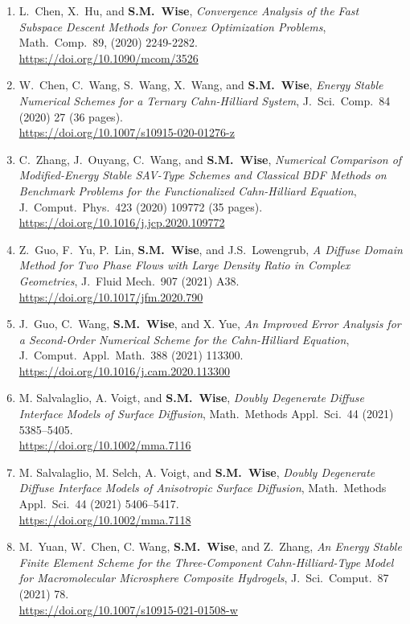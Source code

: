 \documentclass[10pt,letterpaper]{article}
\begin{document}
\begin{enumerate}
	\item
L.~Chen, X.~Hu, and \textbf{S.M.~Wise}, {\sl Convergence Analysis of the Fast Subspace Descent Methods for Convex Optimization Problems}, Math.~Comp.~89, (2020) 2249-2282.
	\\ 
\url{https://doi.org/10.1090/mcom/3526}

	\item
W.~Chen, C.~Wang, S.~Wang, X.~Wang, and \textbf{S.M.~Wise}, {\sl Energy Stable Numerical Schemes for a Ternary Cahn-Hilliard System}, J.~Sci.~Comp.~84 (2020) 27 (36 pages).
	\\ 
\url{https://doi.org/10.1007/s10915-020-01276-z}

	\item
C.~Zhang, J.~Ouyang, C.~Wang, and \textbf{S.M.~Wise}, {\sl Numerical Comparison of Modified-Energy Stable SAV-Type Schemes and Classical BDF Methods on Benchmark Problems for the Functionalized Cahn-Hilliard Equation}, J.~Comput.~Phys.~423 (2020) 109772 (35 pages).
	\\ 
\url{https://doi.org/10.1016/j.jcp.2020.109772}

	\item
Z.~Guo, F.~Yu, P.~Lin, \textbf{S.M.~Wise}, and J.S.~Lowengrub, {\sl A Diffuse Domain Method for Two Phase Flows with Large Density Ratio in Complex Geometries}, J.~Fluid Mech.~907 (2021) A38.
	\\
\url{https://doi.org/10.1017/jfm.2020.790}

	\item
J.~Guo, C.~Wang, \textbf{S.M.~Wise}, and X. Yue, {\sl An Improved Error Analysis for a Second-Order Numerical Scheme for the Cahn-Hilliard Equation}, J.~Comput.~Appl.~Math.~388 (2021) 113300.
	\\
\url{https://doi.org/10.1016/j.cam.2020.113300}

	\item
M. Salvalaglio, A. Voigt, and \textbf{S.M.~Wise}, {\sl Doubly Degenerate Diffuse Interface Models of Surface Diffusion}, Math.~Methods Appl.~Sci.~44 (2021) 5385--5405.
	\\
\url{https://doi.org/10.1002/mma.7116}

	\item
M. Salvalaglio, M. Selch, A. Voigt, and \textbf{S.M.~Wise}, {\sl Doubly Degenerate Diffuse Interface Models of Anisotropic Surface Diffusion}, Math.~Methods Appl.~Sci.~44 (2021) 5406--5417.
	\\
\url{https://doi.org/10.1002/mma.7118}

	\item
M.~Yuan, W.~Chen, C. Wang, \textbf{S.M.~Wise}, and Z.~Zhang, {\sl An Energy Stable Finite Element Scheme for the Three-Component Cahn-Hilliard-Type Model for Macromolecular Microsphere Composite Hydrogels}, J.~Sci.~Comput.~87 (2021) 78.
	\\ 
\url{https://doi.org/10.1007/s10915-021-01508-w}


\end{enumerate}
\end{document}
